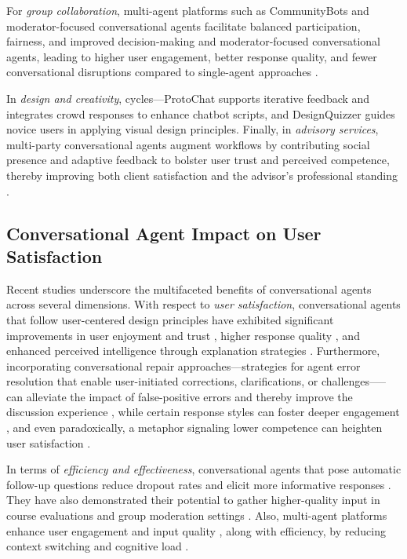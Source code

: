 For \textit{group collaboration}, multi-agent platforms such as CommunityBots \cite{Jiang2023} and moderator-focused conversational agents facilitate balanced participation, fairness, and improved decision-making \cite{Do2022} and moderator-focused conversational agents\cite{ bagmar2022}, leading to higher user engagement\cite{kim2021}, better response quality\cite{Do2023}, and fewer conversational disruptions compared to single-agent approaches \citep{Jiang2023}. 

In \textit{design and creativity}, cycles—ProtoChat \cite{choi2021} supports iterative feedback and integrates crowd responses to enhance chatbot scripts, and DesignQuizzer \cite{peng2024} guides novice users in applying visual design principles. Finally, in \textit{advisory services}, multi-party conversational agents augment workflows by contributing social presence and adaptive feedback to bolster user trust and perceived competence, thereby improving both client satisfaction and the advisor's professional standing \citep{bucher2024, schmid2022}.

\subsection{Conversational Agent Impact on User Satisfaction}
Recent studies underscore the multifaceted benefits of conversational agents across several dimensions. With respect to \textit{user satisfaction}, conversational agents that follow user-centered design principles have exhibited significant improvements in user enjoyment and trust \citep{schmitt2022}, higher response quality \citep{wambsganss2022}, and enhanced perceived intelligence through explanation strategies \citep{Do2023}. Furthermore, incorporating conversational repair approaches---strategies for agent error resolution that enable user-initiated corrections, clarifications, or challenges—--can alleviate the impact of false-positive errors and thereby improve the discussion experience \citep{Do2022}, while certain response styles can foster deeper engagement \citep{cho2020}, and even paradoxically, a metaphor signaling lower competence can heighten user satisfaction \citep{khadpe2020}. 

In terms of \textit{efficiency and effectiveness}, conversational agents that pose automatic follow-up questions reduce dropout rates and elicit more informative responses \citep{Hu2024}. They have also demonstrated their potential to gather higher-quality input in course evaluations \cite{wambsganss2022} and group moderation settings \cite{bagmar2022}. Also, multi-agent platforms enhance user engagement and input quality \cite{Jiang2023}, along with efficiency, by reducing context switching and cognitive load \cite{Luger2016}. 

